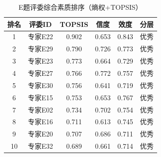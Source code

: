 \begin{table}[h]
\centering
\caption{E题评委综合素质排序（熵权+TOPSIS）}
\begin{tabular}{cccccc}
\hline
排名 & 评委ID & TOPSIS & 信度 & 效度 & 分层 \\
\hline
1 & 专家E22 & 0.902 & 0.653 & 0.843 & 优秀 \\
2 & 专家E29 & 0.790 & 0.726 & 0.773 & 优秀 \\
3 & 专家E23 & 0.773 & 0.664 & 0.729 & 优秀 \\
4 & 专家E27 & 0.766 & 0.772 & 0.757 & 优秀 \\
5 & 专家E30 & 0.756 & 0.641 & 0.719 & 优秀 \\
6 & 专家E15 & 0.753 & 0.653 & 0.767 & 优秀 \\
7 & 专家E02 & 0.734 & 0.702 & 0.754 & 优秀 \\
8 & 专家E16 & 0.711 & 0.613 & 0.745 & 优秀 \\
9 & 专家E20 & 0.707 & 0.686 & 0.711 & 优秀 \\
10 & 专家E32 & 0.689 & 0.661 & 0.714 & 优秀 \\
\hline
\end{tabular}
\end{table}